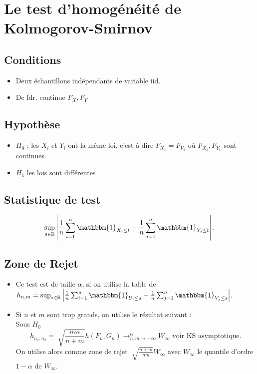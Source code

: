 \documentclass{article}
\theoremstyle{plain}%
\theoremstyle{definition}
\theoremstyle{remark}
\begin{document}
\section{Le test d'homogénéité de Kolmogorov-Smirnov}
\subsection*{Conditions}
\begin{itemize}
    \item Deux échantillons indépendants de variable iid.
    \item De fdr. continue $ F_X, F_Y $ 
\end{itemize}

\subsection*{Hypothèse}
\begin{itemize}
    \item $ H_0 $ : les $ X_i $ et $ Y_i $ ont la même loi, c'est à dire $ F_{X_1} = F_{V_1} $ où $ F_{X_1}, F_{Y_1} $ sont continues.
    \item $ H_1 $ les lois sont différentes
\end{itemize}

\subsection*{Statistique de test}
\[
    \sup _{s \in \mathbb{R}} \left| \frac{1}{n}\sum_{i=1}^{n} \mathbbm{1}_{X_i \leq t} - \frac{1}{n}\sum_{j=1}^{n} \mathbbm{1}_{Y_j \leq t} \right| 
.\]
\subsection*{Zone de Rejet}
\begin{itemize}
    \item Ce test est de taille $ \alpha  $, si on utilise la table de $ h_{n,m} = \sup _{s \in \mathbb{R}} \left| \frac{1}{n}\sum_{i=1}^{n} \mathbbm{1}_{U_i \leq s} - \frac{1}{n}\sum_{j=1}^{n} \mathbbm{1}_{V_j \leq s} \right| $.
    \item Si $ n $ et $ m $ sont trop grands, on utilise le résultat suivant : \\
        Sous $ H_0 $ 
        \[
            h_{n_1, n_2} = \sqrt[]{\frac{nm}{n+m}}h(F_n, G_n) \to ^{\alpha }_{n,m \to +\infty } W_\infty \text{ voir KS asymptotique}
        .\]
        On utilise alors comme zone de rejet $ \sqrt[]{\frac{n+m}{nm}}W_\infty  $ avec $ W_\infty  $ le quantile d'ordre $ 1 - \alpha  $ de $ W_\infty  $.
\end{itemize}
\end{document}
